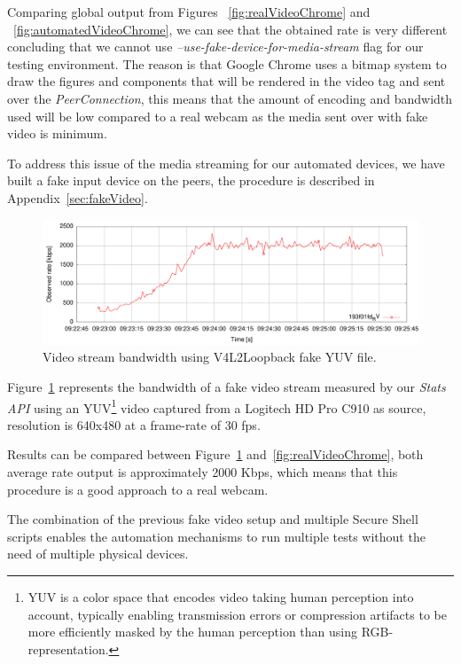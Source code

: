 Comparing global output from Figures ~\ref{fig:realVideoChrome} and ~\ref{fig:automatedVideoChrome}, we can see that the obtained rate is very different concluding that we cannot use {\it --use-fake-device-for-media-stream} flag for our testing environment. The reason is that Google Chrome uses a bitmap system to draw the figures and components that will be rendered in the video tag and sent over the {\it PeerConnection}, this means that the amount of encoding and bandwidth used will be low compared to a real webcam as the media sent over with fake video is minimum.

To address this issue of the media streaming for our automated devices, we have built a fake input device on the peers, the procedure is described in Appendix~\ref{sec:fakeVideo}.

 \begin{figure}[h]
  \centering
    \includegraphics[width=1\textwidth]{./figures/testV4L2niklas.pdf}
      \caption[Video stream bandwidth using V4L2Loopback fake YUV file]{Video stream bandwidth using V4L2Loopback fake YUV file.}
	\label{fig:testV4L2niklas}
\end{figure}

Figure~\ref{fig:testV4L2niklas} represents the bandwidth of a fake video stream measured by our {\it Stats API} using an YUV\footnote{YUV is a color space that encodes video taking human perception into account, typically enabling transmission errors or compression artifacts to be more efficiently masked by the human perception than using RGB-representation.} video captured from a Logitech HD Pro C910 as source, resolution is 640x480 at a frame-rate of 30 fps. 

Results can be compared between Figure~\ref{fig:testV4L2niklas} and~\ref{fig:realVideoChrome}, both average rate output is approximately 2000 Kbps, which means that this procedure is a good approach to a real webcam. 

The combination of the previous fake video setup and multiple Secure Shell  scripts enables the automation mechanisms to run multiple tests without the need of multiple physical devices.


